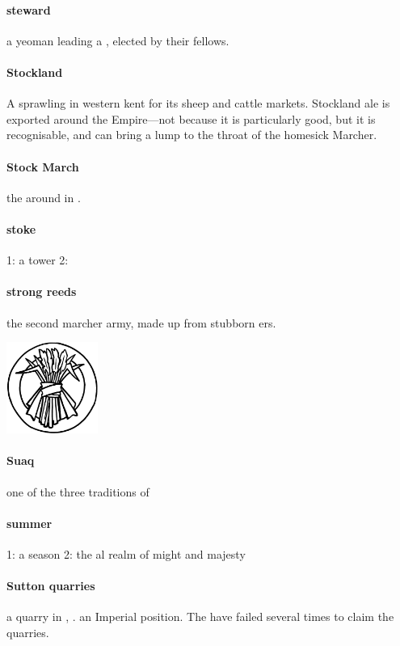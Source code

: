 \paragraph{steward} a yeoman leading a , elected by their fellows.
\paragraph{Stockland} A sprawling  in western  kent for its sheep and cattle markets. Stockland ale is exported around the Empire—not because it is particularly good, but it is recognisable, and can bring a lump to the throat of the homesick Marcher. 
\paragraph{Stock March} the  around  in .
\paragraph{stoke} 1: a tower 2: 
\paragraph{strong reeds} the second marcher army, made up from stubborn ers.\begin{center}\includegraphics[width=3cm]{encyclopedia/StrongReeds}\end{center}
\paragraph{Suaq} one of the three traditions of 
\paragraph{summer} 1: a season 2: the al realm of might and majesty
\paragraph{Sutton quarries} a  quarry in , . an Imperial  position. The  have failed several times to claim the quarries.

